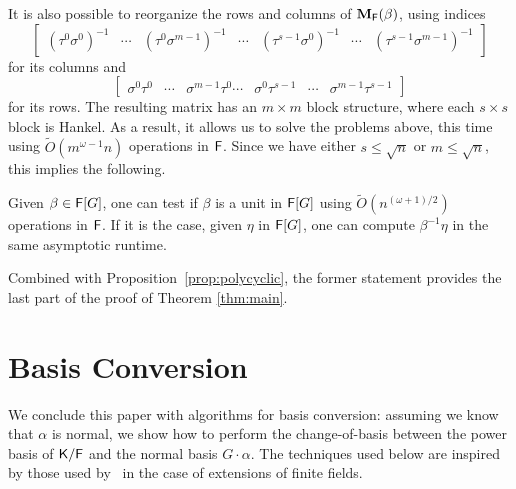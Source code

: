 It is also possible to reorganize the rows and columns of 
 $\mat M_\F(\beta)$, using indices
$$\begin{bmatrix}
(\tau^0 \sigma^0)^{-1} & \cdots & (\tau^0 \sigma^{m-1})^{-1} & \cdots& (\tau^{s-1} \sigma^0)^{-1} & \cdots&  (\tau^{s-1} \sigma^{m-1})^{-1}
\end{bmatrix}$$
for its columns and 
$$\begin{bmatrix}
\sigma^0 \tau^0 &  \cdots & \sigma^{m-1} \tau^0 \cdots& \sigma^0 \tau^{s-1} &  \cdots & \sigma^{m-1} \tau^{s-1}
\end{bmatrix}
$$ for its rows. The resulting matrix has an $m \times m$ block
structure, where each $s\times s$ block is Hankel. As a result, it
allows us to solve the problems above, this time using
$\tilde{O}(m^{\omega-1} n)$ operations in ${\mathsf{F}}$.  Since we have either
$s\le \sqrt n$ or $m \le \sqrt n$, this implies the following.

\begin{proposition}
  Given $\beta \in {\mathsf{F}}[G]$, one can test if $\beta$ is a unit in
  ${\mathsf{F}}[G]$ using $\tilde{O}(n^{(\omega+1)/2})$ operations in ${\mathsf{F}}$.  If
  it is the case, given $\eta$ in ${\mathsf{F}}[G]$, one can compute $\beta^{-1}
  \eta$ in the same asymptotic runtime.
\end{proposition}
Combined with Proposition~\ref{prop:polycyclic}, the former statement
provides the last part of the proof of Theorem \ref{thm:main}.






 \section{Basis Conversion}\label{sec:conversion}

We conclude this paper with algorithms for basis conversion: assuming
we know that $\alpha$ is normal, we show how to perform the
change-of-basis between the power basis of ${\mathsf{K}}/{\mathsf{F}}$ and the normal
basis $G\cdot \alpha$. The techniques used below are inspired by 
those used by~\cite[Section~4]{KalSho98} in the case of extensions
of finite fields.

